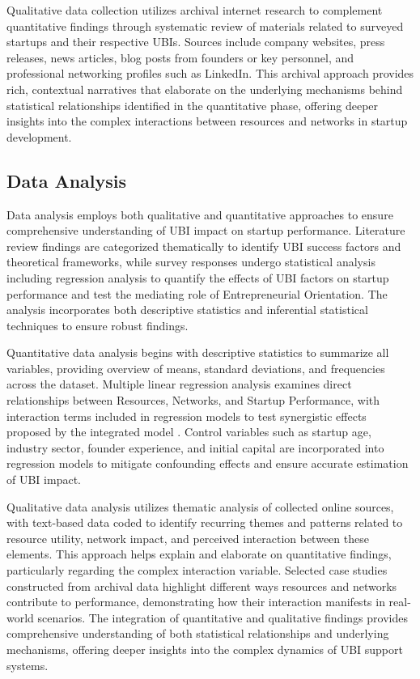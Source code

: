 \documentclass[../Main.tex]{subfiles}
\begin{document}
    Qualitative data collection utilizes archival internet research to complement quantitative findings through systematic review of materials related to surveyed startups and their respective UBIs. Sources include company websites, press releases, news articles, blog posts from founders or key personnel, and professional networking profiles such as LinkedIn. This archival approach provides rich, contextual narratives that elaborate on the underlying mechanisms behind statistical relationships identified in the quantitative phase, offering deeper insights into the complex interactions between resources and networks in startup development.

    \subsection{Data Analysis}
    \label{subsection:4.2.3_Data_analysis}
    Data analysis employs both qualitative and quantitative approaches to ensure comprehensive understanding of UBI impact on startup performance. Literature review findings are categorized thematically to identify UBI success factors and theoretical frameworks, while survey responses undergo statistical analysis including regression analysis to quantify the effects of UBI factors on startup performance and test the mediating role of Entrepreneurial Orientation. The analysis incorporates both descriptive statistics and inferential statistical techniques to ensure robust findings.

    Quantitative data analysis begins with descriptive statistics to summarize all variables, providing overview of means, standard deviations, and frequencies across the dataset. Multiple linear regression analysis examines direct relationships between Resources, Networks, and Startup Performance, with interaction terms included in regression models to test synergistic effects proposed by the integrated model \autocite{al2017challenges}. Control variables such as startup age, industry sector, founder experience, and initial capital are incorporated into regression models to mitigate confounding effects and ensure accurate estimation of UBI impact.

    Qualitative data analysis utilizes thematic analysis of collected online sources, with text-based data coded to identify recurring themes and patterns related to resource utility, network impact, and perceived interaction between these elements. This approach helps explain and elaborate on quantitative findings, particularly regarding the complex interaction variable. Selected case studies constructed from archival data highlight different ways resources and networks contribute to performance, demonstrating how their interaction manifests in real-world scenarios. The integration of quantitative and qualitative findings provides comprehensive understanding of both statistical relationships and underlying mechanisms, offering deeper insights into the complex dynamics of UBI support systems.
\end{document}

